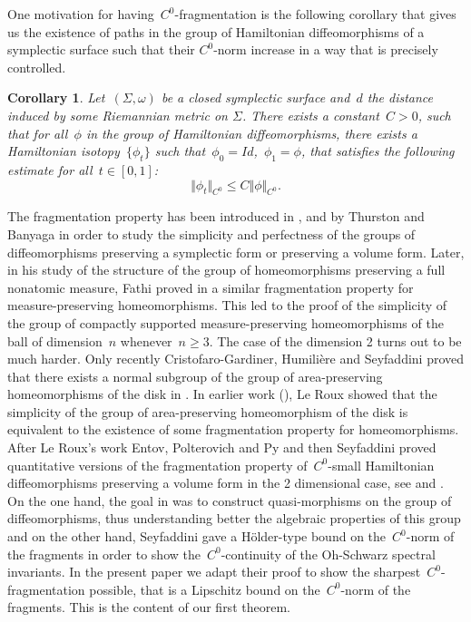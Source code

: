 \documentclass[10pt]{amsart}
\newtheorem{coro}{Corollary}
\begin{document}
One motivation for having~$C^0$-fragmentation is the following corollary that gives us the existence of paths in the group of Hamiltonian diffeomorphisms of a symplectic surface such that their $C^0$-norm increase in a way that is precisely controlled.

\begin{coro}\label{coro: $C^0$-small isotopy}
	Let~$(\Sigma, \omega)$ be a closed symplectic surface and~$d$ the distance induced by some Riemannian metric on $\Sigma$. There exists a constant~$C>0$, such that for all~$\phi$ in the group of Hamiltonian diffeomorphisms, there exists a Hamiltonian isotopy~$\{\phi_t\}$ such that~$\phi_0=Id$,~$\phi_1=\phi$, that satisfies the following estimate for all~$t \in [0,1]$:
	$$\Vert \phi_t \Vert_{C^0}\leq C \Vert \phi \Vert_{C^0}.$$
\end{coro}

The fragmentation property has been introduced  in \cite{Thurston}, \cite{Ban78} and \cite{Ban97} by Thurston and Banyaga in order to study the simplicity and perfectness of the groups of diffeomorphisms preserving a symplectic form or preserving a volume form. Later, in his study of the structure of the group of homeomorphisms preserving a full nonatomic measure, Fathi proved in \cite{Fathi} a similar fragmentation property for measure-preserving homeomorphisms. This led to the proof of the simplicity of the group of compactly supported measure-preserving homeomorphisms of the ball of dimension~$n$ whenever~$n\geq 3$. The case of the dimension 2 turns out to be much harder. Only recently Cristofaro-Gardiner, Humilière and Seyfaddini proved that there exists a normal subgroup of the group of area-preserving homeomorphisms of the disk in \cite{CriHumSey}. In earlier work (\cite{LeRoux}), Le Roux showed that the simplicity of the group of area-preserving homeomorphism of the disk is equivalent to the existence of some fragmentation property for homeomorphisms. After Le Roux's work Entov, Polterovich and Py and then Seyfaddini proved quantitative versions of the fragmentation property of~$C^0$-small Hamiltonian diffeomorphisms preserving a volume form in the 2 dimensional case, see \cite[Section 1.6.2]{EPP} and \cite[Proposition 3.1]{Seyfaddini}. On the one hand, the goal in \cite{EPP} was to construct quasi-morphisms on the group of diffeomorphisms, thus understanding better the algebraic properties of this group and on the other hand, Seyfaddini gave a Hölder-type bound on the~$C^0$-norm of the fragments in order to show the~$C^0$-continuity of the Oh-Schwarz spectral invariants. In the present paper we adapt their proof to show the sharpest~$C^0$-fragmentation possible, that is a Lipschitz bound on the~$C^0$-norm of the fragments. This is the content of our first theorem.
\end{document}
